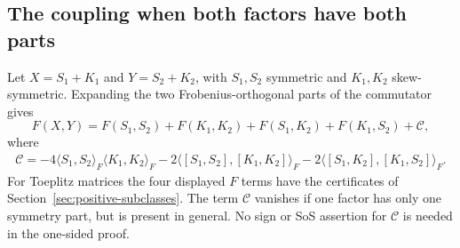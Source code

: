 \subsection{The coupling when both factors have both parts}
\label{app:positive-coupling}

Let $X=S_1+K_1$ and $Y=S_2+K_2$, with $S_1,S_2$ symmetric and $K_1,K_2$
skew-symmetric. Expanding the two Frobenius-orthogonal parts of
the commutator gives
\[
 F(X,Y)=F(S_1,S_2)+F(K_1,K_2)+F(S_1,K_2)+F(K_1,S_2)+\mathcal C,
\]
where
\[
 \begin{aligned}
 \mathcal C= -4\langle S_1,S_2\rangle_F\langle K_1,K_2\rangle_F
 -2\langle[S_1,S_2],[K_1,K_2]\rangle_F -2\langle[S_1,K_2],[K_1,S_2]\rangle_F.
 \end{aligned}
\]
For Toeplitz matrices the four displayed $F$ terms have the
certificates of Section~\ref{sec:positive-subclasses}. The term
$\mathcal C$ vanishes if one factor has only one symmetry part,
but is present in general. No sign or SoS assertion for
$\mathcal C$ is needed in the one-sided proof.
